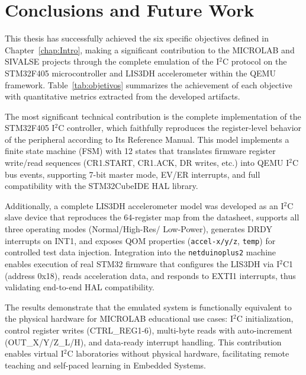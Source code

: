 \chapter{Conclusions and Future Work}

This thesis has successfully achieved the six specific objectives defined in 
Chapter~\ref{chap:Intro}, making a significant contribution to the MICROLAB 
and SIVALSE projects through the complete emulation of the I$^2$C protocol on the 
STM32F405 microcontroller and LIS3DH accelerometer within the QEMU framework. 
Table~\ref{tab:objetivos} summarizes the achievement of each objective with 
quantitative metrics extracted from the developed artifacts.


The most significant technical contribution is the  complete implementation of the 
STM32F405 I$^2$C controller, which faithfully reproduces the register-level behavior of the peripheral according to Its
Reference Manual. This model implements a finite state machine (FSM) with 12 
states that translates firmware register write/read sequences (CR1.START, CR1.ACK, 
DR writes, etc.) into QEMU I$^2$C bus events, supporting 7-bit master mode, EV/ER 
interrupts, and full compatibility with the STM32CubeIDE HAL 
library.

Additionally, a complete LIS3DH accelerometer model  was developed 
as an I$^2$C slave device that reproduces the 64-register map from the datasheet, supports all three operating modes (Normal/High-Res/
Low-Power), generates DRDY interrupts on INT1, and exposes 
QOM properties (\texttt{accel-x/y/z}, \texttt{temp}) for controlled test data 
injection. Integration into the \texttt{netduinoplus2} machine enables execution of 
real STM32 firmware that configures the LIS3DH via I$^2$C1 (address 0x18), reads 
acceleration data, and responds to EXTI1 interrupts, thus validating end-to-end HAL 
compatibility.

The results demonstrate that the emulated system is  functionally equivalent to 
the physical hardware  for MICROLAB educational use cases: I$^2$C initialization, 
control register writes (CTRL\_REG1-6), multi-byte reads with auto-increment 
(OUT\_X/Y/Z\_L/H), and data-ready interrupt handling. This contribution enables 
virtual I$^2$C laboratories without physical hardware, facilitating remote teaching 
and self-paced learning in Embedded Systems.

